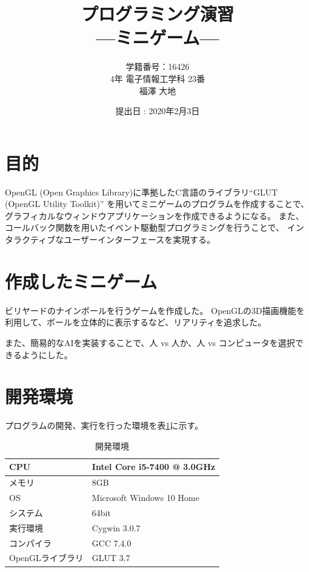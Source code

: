 \documentclass[a4j,titlepage]{jsarticle}
\begin{document}
\begin{titlepage}
  \title{\huge{プログラミング演習} \\ \LARGE{---ミニゲーム---}}
	\author{学籍番号：16426 \\ 4年 電子情報工学科 23番 \\ 福澤 大地}
	\date{提出日 : 2020年2月3日}
  \maketitle
\end{titlepage}


\section{目的}
OpenGL (Open Graphics Library)に準拠したC言語のライブラリ``GLUT (OpenGL Utility Toolkit)''
を用いてミニゲームのプログラムを作成することで、
グラフィカルなウィンドウアプリケーションを作成できるようになる。
また、コールバック関数を用いたイベント駆動型プログラミングを行うことで、
インタラクティブなユーザーインターフェースを実現する。


\section{作成したミニゲーム}
ビリヤードのナインボールを行うゲームを作成した。
OpenGLの3D描画機能を利用して、ボールを立体的に表示するなど、リアリティを追求した。

また、簡易的なAIを実装することで、人 vs 人か、人 vs コンピュータを選択できるようにした。


\section{開発環境}
プログラムの開発、実行を行った環境を表\ref{tb:kan}に示す。

\begin{table}[H]
  \centering
  \caption{開発環境}
  \label{tb:kan}

  \begin{tabular}{|l|l|}
    \hline
    CPU & Intel Core i5-7400 @ 3.0GHz \\ \hline
    メモリ & 8GB \\ \hline
    OS & Microsoft Windows 10 Home \\ \hline
    システム & 64bit \\ \hline
    実行環境 & Cygwin 3.0.7 \\ \hline
    コンパイラ & GCC 7.4.0 \\ \hline
    OpenGLライブラリ & GLUT 3.7 \\ \hline
  \end{tabular}
\end{table}
\end{document}
